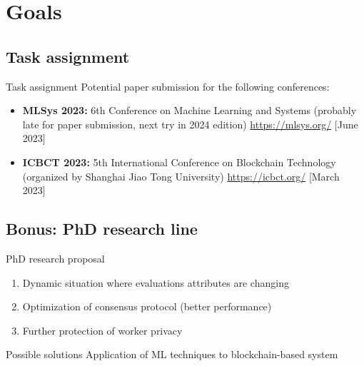 

\section{Goals}

\subsection{Task assignment}

\begin{frame}{Task assignment}
	Potential paper submission for the following conferences:
  \begin{itemize}
  	\item \textbf{MLSys 2023:} 6th Conference on Machine Learning and Systems (probably late for paper submission, next try in 2024 edition) \url{https://mlsys.org/} [June 2023]
  	\item \textbf{ICBCT 2023:} 5th International Conference on Blockchain Technology (organized by Shanghai Jiao Tong University) \url{https://icbct.org/} [March 2023]
  \end{itemize}
\end{frame}

\subsection{Bonus: PhD research line}

\begin{frame}{PhD research proposal}
  \begin{enumerate}
  \item Dynamic situation where evaluations attributes are changing
  \item Optimization of consensus protocol (better performance)
  \item Further protection of worker privacy
  \end{enumerate}
  \begin{block}{Possible solutions}
  Application of ML techniques to blockchain-based system
  \end{block}
\end{frame}

